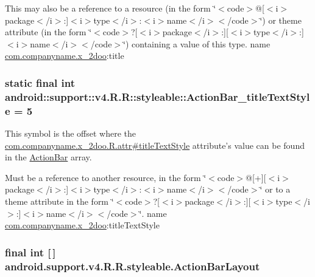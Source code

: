 This may also be a reference to a resource (in the form \char`\"{}$<$code$>$@\mbox{[}$<$i$>$package$<$/i$>$:\mbox{]}$<$i$>$type$<$/i$>$:$<$i$>$name$<$/i$>$$<$/code$>$\char`\"{}) or theme attribute (in the form \char`\"{}$<$code$>$?\mbox{[}$<$i$>$package$<$/i$>$:\mbox{]}\mbox{[}$<$i$>$type$<$/i$>$:\mbox{]}$<$i$>$name$<$/i$>$$<$/code$>$\char`\"{}) containing a value of this type.  name \hyperlink{namespacecom_1_1companyname_1_1x__2doo}{com.companyname.x\_\-2doo}:title \hypertarget{classandroid_1_1support_1_1v4_1_1_r_1_1styleable_6a25d0e26442974dff249844cf2955a8}{
\subsubsection[{ActionBar\_\-titleTextStyle}]{\setlength{\rightskip}{0pt plus 5cm}static final int android::support::v4.R.R::styleable::ActionBar\_\-titleTextStyle = 5}}
\label{classandroid_1_1support_1_1v4_1_1_r_1_1styleable_6a25d0e26442974dff249844cf2955a8}


This symbol is the offset where the \hyperlink{classcom_1_1companyname_1_1x__2doo_1_1_r_1_1attr_dcb150fd31ab9183bee97759585558cd}{com.companyname.x\_\-2doo.R.attr\#titleTextStyle} attribute's value can be found in the \hyperlink{classandroid_1_1support_1_1v4_1_1_r_1_1styleable_5c6cf2c83551ebae05f365bb913fdddf}{ActionBar} array.

Must be a reference to another resource, in the form \char`\"{}$<$code$>$@\mbox{[}+\mbox{]}\mbox{[}$<$i$>$package$<$/i$>$:\mbox{]}$<$i$>$type$<$/i$>$:$<$i$>$name$<$/i$>$$<$/code$>$\char`\"{} or to a theme attribute in the form \char`\"{}$<$code$>$?\mbox{[}$<$i$>$package$<$/i$>$:\mbox{]}\mbox{[}$<$i$>$type$<$/i$>$:\mbox{]}$<$i$>$name$<$/i$>$$<$/code$>$\char`\"{}.  name \hyperlink{namespacecom_1_1companyname_1_1x__2doo}{com.companyname.x\_\-2doo}:titleTextStyle \hypertarget{classandroid_1_1support_1_1v4_1_1_r_1_1styleable_af2d29b7fdd4bc3d0c0d77e61105407e}{
\subsubsection[{ActionBarLayout}]{\setlength{\rightskip}{0pt plus 5cm}final int \mbox{[}$\,$\mbox{]} android.support.v4.R.R.styleable.ActionBarLayout}}
\label{classandroid_1_1support_1_1v4_1_1_r_1_1styleable_af2d29b7fdd4bc3d0c0d77e61105407e}


